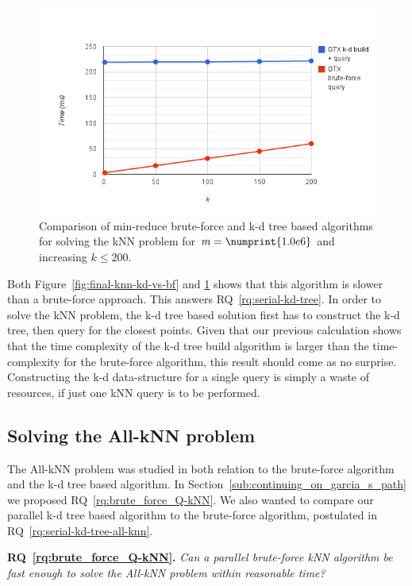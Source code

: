 \begin{figure}[ht!]
    \centering
    \includegraphics[width=120mm]{../gfx/final-var-knn-kd-vs-bf.png}
    \caption{Comparison of min-reduce brute-force and k-d tree based algorithms for solving the kNN problem for $m=\numprint{1.0e6}$ and increasing $k\le200$.}
    \label{fig:final-var-knn-kd-vs-bf}
\end{figure}

Both Figure~\ref{fig:final-knn-kd-vs-bf} and \ref{fig:final-var-knn-kd-vs-bf} shows that this algorithm is slower than a brute-force approach. This answers RQ~\ref{rq:serial-kd-tree}. In order to solve the kNN problem, the k-d tree based solution first has to construct the k-d tree, then query for the closest points. Given that our previous calculation shows that the time complexity of the k-d tree build algorithm is larger than the time-complexity for the brute-force algorithm, this result should come as no surprise. Constructing the k-d data-structure for a single query is simply a waste of resources, if just one kNN query is to be performed.

\subsection{Solving the All-kNN problem} %
\label{sub:solving_the_all_knn_problem}

The All-kNN problem was studied in both relation to the brute-force algorithm and the k-d tree based algorithm. In Section~\ref{sub:continuing_on_garcia_s_path} we proposed RQ~\ref{rq:brute_force_Q-kNN}. We also wanted to compare our parallel k-d tree based algorithm to the brute-force algorithm, postulated in RQ~\ref{rq:serial-kd-tree-all-knn}.

\textbf{RQ~\ref{rq:brute_force_Q-kNN}.} \emph{Can a parallel brute-force kNN algorithm be fast enough to solve the All-kNN problem within reasonable time?}

